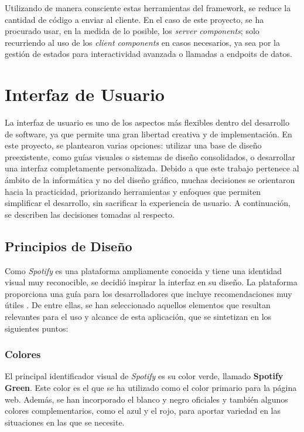Utilizando de manera consciente estas herramientas del framework, se reduce la cantidad de código a enviar al cliente. En el caso de este proyecto, se ha procurado usar, en la medida de lo posible, los \textit{server components}; solo recurriendo al uso de los \textit{client components} en casos necesarios, ya sea por la gestión de estados para interactividad avanzada o llamadas a endpoits de datos.

\section{Interfaz de Usuario}

La interfaz de usuario es uno de los aspectos más flexibles dentro del desarrollo de software, ya que permite una gran libertad creativa y de implementación. En este proyecto, se plantearon varias opciones: utilizar una base de diseño preexistente, como guías visuales o sistemas de diseño consolidados, o desarrollar una interfaz completamente personalizada. Debido a que este trabajo pertenece al ámbito de la informática y no del diseño gráfico, muchas decisiones se orientaron hacia la practicidad, priorizando herramientas y enfoques que permiten simplificar el desarrollo, sin sacrificar la experiencia de usuario. A continuación, se describen las decisiones tomadas al respecto.

\subsection{Principios de Diseño}

Como \textit{Spotify} es una plataforma ampliamente conocida y tiene una identidad visual muy reconocible, se decidió inspirar la interfaz en su diseño. La plataforma proporciona una guía para los desarrolladores que incluye recomendaciones muy útiles \cite{spotifyDesign2025}. De entre ellas, se han seleccionado aquellos elementos que resultan relevantes para el uso y alcance de esta aplicación, que se sintetizan en los siguientes puntos:

\subsubsection*{Colores}

El principal identificador visual de \textit{Spotify} es su color verde, llamado \textbf{Spotify Green}. Este color es el que se ha utilizado como el color primario para la página web. Además, se han incorporado el blanco y negro oficiales y también algunos colores complementarios, como el azul y el rojo, para aportar variedad en las situaciones en las que se necesite.

